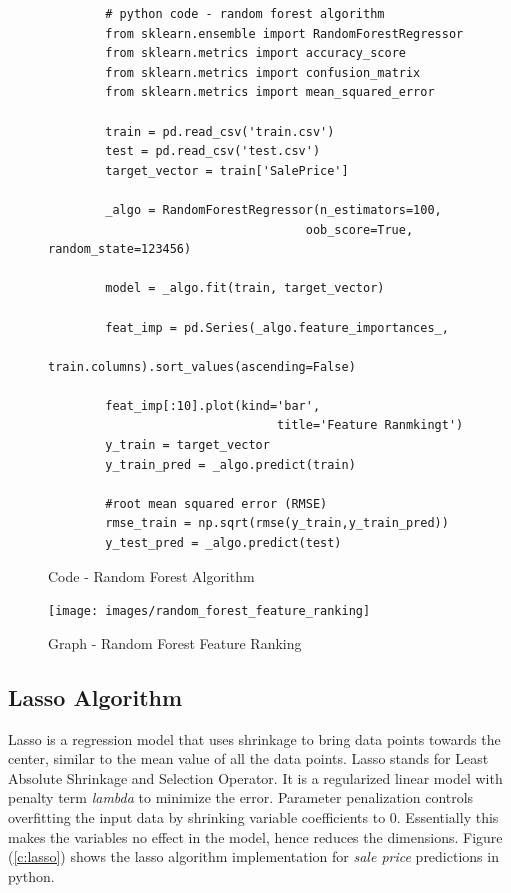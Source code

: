\documentclass[sigconf]{acmart}
\begin{document}
		\begin{figure}[htb]
		\begin{verbatim}		
		# python code - random forest algorithm
		from sklearn.ensemble import RandomForestRegressor
		from sklearn.metrics import accuracy_score
		from sklearn.metrics import confusion_matrix
		from sklearn.metrics import mean_squared_error
		
		train = pd.read_csv('train.csv')
		test = pd.read_csv('test.csv')
		target_vector = train['SalePrice']
		
		_algo = RandomForestRegressor(n_estimators=100, 
									oob_score=True, random_state=123456)
		
		model = _algo.fit(train, target_vector)  
		
		feat_imp = pd.Series(_algo.feature_importances_, 
							train.columns).sort_values(ascending=False)
							
		feat_imp[:10].plot(kind='bar', 
								title='Feature Ranmkingt')		
		y_train = target_vector
		y_train_pred = _algo.predict(train)
		
		#root mean squared error (RMSE)
		rmse_train = np.sqrt(rmse(y_train,y_train_pred))			
		y_test_pred = _algo.predict(test)		
		\end{verbatim}
		\caption{Code - Random Forest Algorithm} \label{c:rf} 
		\end{figure}


	\begin{figure}[htb]
		\centering
		\texttt{[image: images/random\_forest\_feature\_ranking]}	
		\caption{Graph - Random Forest Feature Ranking} \label{fig:random-feature-ranking} 
	\end{figure}
		
	\subsection{Lasso Algorithm}
	
	Lasso is a regression model that uses shrinkage to bring data points towards the center, similar to the mean value of all the data points. Lasso stands for Least Absolute Shrinkage and Selection Operator. It is a regularized linear model with penalty term {\em lambda} to minimize the error. Parameter penalization controls overfitting the input data by shrinking variable coefficients to 0. Essentially this makes the variables no effect in the model, hence reduces the dimensions. Figure (\ref{c:lasso}) shows the lasso algorithm implementation for {\em sale price} predictions in python.
		
\end{document}

